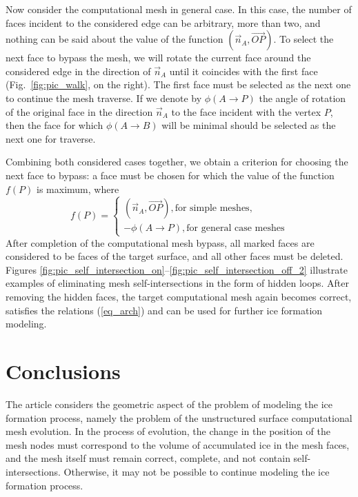 \documentclass[
11pt,
tightenlines,
twoside,
onecolumn,
nofloats,
nobibnotes,
nofootinbib,
superscriptaddress,
noshowpacs,
centertags]
{revtex4}
\begin{document}
Now consider the computational mesh in general case.
In this case, the number of faces incident to the considered edge can be arbitrary, more than two, and nothing can be said about the value of the function $(\vec{n}_A, \vec{OP})$.
To select the next face to bypass the mesh, we will rotate the current face around the considered edge in the direction of $\vec{n}_A$ until it coincides with the first face (Fig.~\ref{fig:pic_walk}, on the right).
The first face must be selected as the next one to continue the mesh traverse.
If we denote by $\phi(A \rightarrow P)$ the angle of rotation of the original face in the direction $\vec{n}_A$ to the face incident with the vertex $P$, then the face for which $\phi(A \rightarrow B)$ will be minimal should be selected as the next one for traverse.

Combining both considered cases together, we obtain  a criterion for
choosing the next face to bypass: a face must be chosen for which
the value of the function $f(P)$ is maximum, where
\begin{equation*}
f(P) =
\begin{cases}
(\vec{n}_A, \vec{OP}), \text{for simple meshes}, \\
-\phi(A \rightarrow P), \text{for general case meshes}
\end{cases}
\end{equation*}
After completion of the computational mesh bypass, all marked faces are considered to be faces of the target surface, and all other faces must be deleted.
Figures
\ref{fig:pic_self_intersection_on}--\ref{fig:pic_self_intersection_off_2}
illustrate examples of eliminating mesh self-intersections in the
form of hidden loops.
After removing the hidden faces, the target computational mesh again becomes correct, satisfies the relations (\ref{eq_arch}) and can be used for further ice formation modeling.


\section{Conclusions}

The article considers the geometric aspect of the problem of modeling the ice formation process, namely the problem of the unstructured surface computational mesh evolution.
In the process of evolution, the change in the position of the mesh nodes must correspond to the volume of accumulated ice in the mesh faces, and the mesh itself must remain correct, complete, and not contain self-intersections.
Otherwise, it may not be possible to continue modeling the ice formation process.
\end{document}
